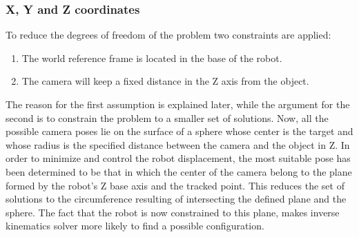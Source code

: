 	\subsubsection{X, Y and Z coordinates} %
	\label{subsub:x_y_and_z_coordinates}
	To reduce the degrees of freedom of the problem two constraints are applied:
	\begin{enumerate}
		\item The world reference frame is located in the base of the robot.
		\item The camera will keep a fixed distance in the Z axis from the object.
	\end{enumerate}
	The reason for the first assumption is explained later, while the argument for the second is to constrain the problem to a smaller set of solutions. 
	Now, all the possible camera poses lie on the surface of a sphere whose center is the target and whose radius is the specified distance between the camera and the object in Z.
	In order to minimize and control the robot displacement, the most suitable pose has been determined to be that in which the center of the camera belong to the plane formed by the robot's Z base axis and the tracked point. 
	This reduces the set of solutions to the circumference resulting of intersecting the defined plane and the sphere.
	The fact that the robot is now constrained to this plane, makes inverse kinematics solver more likely to find a possible configuration.\\

